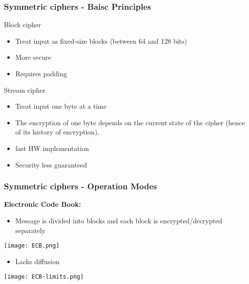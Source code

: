 \documentclass[
hyperref={pdfpagelabels=false}
,xcolor=table
]
{beamer}
\newcommand{\plus}{{\texttt{[image: plus.png]}}}
\newcommand{\minus}{{\texttt{[image: minus.png]}}}
\begin{document}
\begin{frame}
  \frametitle{Symmetric ciphers - Baisc Principles}

  \begin{block}{Block cipher}
    \begin{itemize}
    \item Treat input as fixed-size blocks (between 64 and 128 bits)
    \item[\plus] More secure
    \item[\minus] Requires padding
    \end{itemize}
  \end{block}


  \begin{block}{Stream cipher}
    \begin{itemize}
    \item Treat input one byte at a time
    \item The encryption of one byte depends on the current state of the cipher (hence of its history of encryption), 
    \item[\plus] fast HW implementation
    \item[\minus] Security less guaranteed
    \end{itemize}
  \end{block}
\end{frame}

\begin{frame}
  \frametitle{Symmetric ciphers - Operation Modes}
  \textbf{Electronic Code Book:}
  \begin{itemize}
  \item Message is divided into blocks and each block is encrypted/decrypted separately
  \end{itemize}

  \begin{center}
    \texttt{[image: ECB.png]}
  \end{center}

  \begin{itemize}
  \item[\minus] Lacks diffusion 
  \end{itemize}

  \begin{center}
    \texttt{[image: ECB-limits.png]}
  \end{center}
  
\end{frame}
\end{document}
